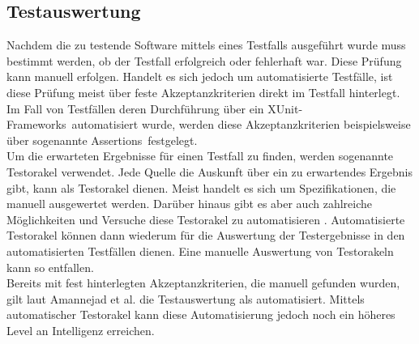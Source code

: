 \subsection{Testauswertung}
\label{subsec:testauswertung}
Nachdem die zu testende Software mittels eines Testfalls ausgeführt wurde muss bestimmt werden, ob der Testfall erfolgreich oder fehlerhaft war. Diese Prüfung kann manuell erfolgen. Handelt es sich jedoch um automatisierte Testfälle, ist diese Prüfung meist über feste Akzeptanzkriterien direkt im Testfall hinterlegt. Im Fall von Testfällen deren Durchführung über ein \grq XUnit-Frameworks\grq\ automatisiert wurde, werden diese Akzeptanzkriterien beispielsweise über sogenannte \grq Assertions\grq\ festgelegt.\\
Um die erwarteten Ergebnisse für einen Testfall zu finden, werden sogenannte Testorakel verwendet.
Jede Quelle die Auskunft über ein zu erwartendes Ergebnis gibt, kann als Testorakel dienen.
Meist handelt es sich um Spezifikationen, die manuell ausgewertet werden.
Darüber hinaus gibt es aber auch zahlreiche Möglichkeiten und Versuche diese Testorakel zu automatisieren \cite{memon_automated_2000} \cite{richardson_specification-based_1992} \cite{shahamiri_comparative_2009}.
Automatisierte Testorakel können dann wiederum für die Auswertung der Testergebnisse in den automatisierten Testfällen dienen. Eine manuelle Auswertung von Testorakeln kann so entfallen.\\
Bereits mit fest hinterlegten Akzeptanzkriterien, die manuell gefunden wurden, gilt laut Amannejad et al. \cite{amannejad_search-based_2014} die Testauswertung als automatisiert. Mittels automatischer Testorakel kann diese Automatisierung jedoch noch ein höheres Level an Intelligenz erreichen. 




